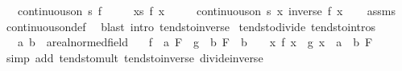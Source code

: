 \begin{isabellebody}
\ \ \ {\isachardoublequoteopen}continuous{\isacharunderscore}{\kern0pt}on\ s\ f{\isachardoublequoteclose}\isanewline
\ \ \ \ \ {\isachardoublequoteopen}{\isasymforall}x{\isasymin}s{\isachardot}{\kern0pt}\ f\ x\ {\isasymnoteq}\ {}{\isachardoublequoteclose}\isanewline
\ \ \ {\isachardoublequoteopen}continuous{\isacharunderscore}{\kern0pt}on\ s\ {\isacharparenleft}{\kern0pt}{\isasymlambda}x{\isachardot}{\kern0pt}\ inverse\ {\isacharparenleft}{\kern0pt}f\ x{\isacharparenright}{\kern0pt}{\isacharparenright}{\kern0pt}{\isachardoublequoteclose}\isanewline
%
\isadelimproof
\ \ %
\endisadelimproof
%
\isatagproof
{}\isamarkupfalse%
\ assms\ \isamarkupfalse%
\ continuous{\isacharunderscore}{\kern0pt}on{\isacharunderscore}{\kern0pt}def\ \isamarkupfalse%
\ {\isacharparenleft}{\kern0pt}blast\ intro{\isacharcolon}{\kern0pt}\ tendsto{\isacharunderscore}{\kern0pt}inverse{\isacharparenright}{\kern0pt}%
\endisatagproof
{\isafoldproof}%
%
\isadelimproof
\isanewline
%
\endisadelimproof
\isanewline
{}\isamarkupfalse%
\ tendsto{\isacharunderscore}{\kern0pt}divide\ {\isacharbrackleft}{\kern0pt}tendsto{\isacharunderscore}{\kern0pt}intros{\isacharbrackright}{\kern0pt}{\isacharcolon}{\kern0pt}\isanewline
\ \ \ a\ b\ {\isacharcolon}{\kern0pt}{\isacharcolon}{\kern0pt}\ {\isachardoublequoteopen}{\isacharprime}{\kern0pt}a{\isacharcolon}{\kern0pt}{\isacharcolon}{\kern0pt}real{\isacharunderscore}{\kern0pt}normed{\isacharunderscore}{\kern0pt}field{\isachardoublequoteclose}\isanewline
\ \ \ {\isachardoublequoteopen}{\isacharparenleft}{\kern0pt}f\ {\isasymlonglongrightarrow}\ a{\isacharparenright}{\kern0pt}\ F\ {\isasymLongrightarrow}\ {\isacharparenleft}{\kern0pt}g\ {\isasymlonglongrightarrow}\ b{\isacharparenright}{\kern0pt}\ F\ {\isasymLongrightarrow}\ b\ {\isasymnoteq}\ {}\ {\isasymLongrightarrow}\ {\isacharparenleft}{\kern0pt}{\isacharparenleft}{\kern0pt}{\isasymlambda}x{\isachardot}{\kern0pt}\ f\ x\ {\isacharslash}{\kern0pt}\ g\ x{\isacharparenright}{\kern0pt}\ {\isasymlonglongrightarrow}\ a\ {\isacharslash}{\kern0pt}\ b{\isacharparenright}{\kern0pt}\ F{\isachardoublequoteclose}\isanewline
%
\isadelimproof
\ \ %
\endisadelimproof
%
\isatagproof
{}\isamarkupfalse%
\ {\isacharparenleft}{\kern0pt}simp\ add{\isacharcolon}{\kern0pt}\ tendsto{\isacharunderscore}{\kern0pt}mult\ tendsto{\isacharunderscore}{\kern0pt}inverse\ divide{\isacharunderscore}{\kern0pt}inverse{\isacharparenright}{\kern0pt}%
\endisatagproof

\end{isabellebody}
